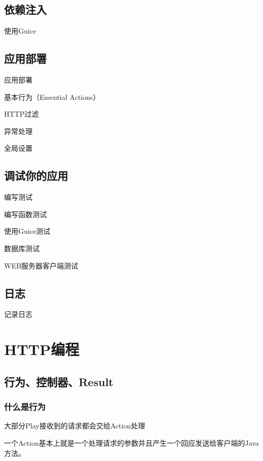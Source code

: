 \documentclass[letterpaper,10pt,english]{sphinxmanual}
\begin{document}
\section{依赖注入}
\label{\detokenize{index:id8}}
使用Guice


\section{应用部署}
\label{\detokenize{index:id9}}
应用部署

基本行为（Essential Actions）

HTTP过滤

异常处理

全局设置


\section{调试你的应用}
\label{\detokenize{index:id10}}
编写测试

编写函数测试

使用Guice测试

数据库测试

WEB服务器客户端测试


\section{日志}
\label{\detokenize{index:id11}}
记录日志


\chapter{HTTP编程}
\label{\detokenize{index:id12}}

\section{行为、控制器、Result}
\label{\detokenize{index:result}}

\subsection{什么是行为}
\label{\detokenize{index:id13}}
大部分Play接收到的请求都会交给Action处理

一个Action基本上就是一个处理请求的参数并且产生一个回应发送给客户端的Java方法。

\begin{sphinxVerbatim}[commandchars=\\\{\}]
   
       
\end{sphinxVerbatim}
\end{document}

